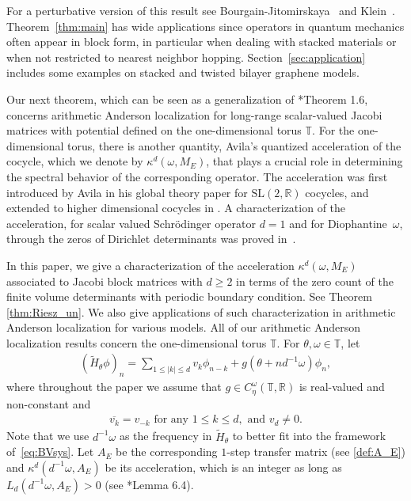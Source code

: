 \documentclass[11pt]{amsart}
\newcommand{\R}{\mathbb R}
\newcommand{\T}{\mathbb T}
\begin{document}
For a perturbative version of this result see Bourgain-Jitomirskaya~\cite{BJ} and Klein~\cite{Kl}.
Theorem~\ref{thm:main} has wide applications since operators in quantum mechanics often appear in block form, in particular when dealing with stacked materials or when not restricted to nearest neighbor hopping.   
Section~\ref{sec:application} includes some examples on stacked and twisted bilayer graphene models.


Our next theorem,  which can be seen as a generalization of \cite{HS2}*{Theorem 1.6}, concerns arithmetic Anderson localization for long-range scalar-valued Jacobi matrices with potential defined on the one-dimensional torus $\T$. 
For the one-dimensional torus, there is another quantity, Avila's quantized acceleration of the cocycle, which we denote by $\kappa^d(\omega,M_E)$, that plays a crucial role in determining the spectral behavior of the corresponding operator.
The acceleration was first introduced by Avila in his global theory paper \cite{Global} for $\mathrm{SL}(2,\R)$ cocycles, and extended to higher dimensional cocycles in \cite{AJS}.
A characterization of the acceleration, for scalar valued Schr\"odinger operator $d=1$ and for Diophantine~$\omega$, through the zeros of Dirichlet determinants was proved in~\cite{HS2}. 

In this paper, we give a characterization of the acceleration $\kappa^d(\omega,M_E)$ associated to Jacobi block matrices with $d\geq 2$ in terms of the zero count of the finite volume determinants with periodic boundary condition. See Theorem \ref{thm:Riesz_un}. 
We also give applications of such characterization in arithmetic Anderson localization for various models.
All of our arithmetic Anderson localization results concern the one-dimensional torus $\T$.
For $\theta,\omega\in \T$, let 
\begin{align}\label{def:tH}
    (\tilde{H}_{\theta}\phi)_n=\sum_{1\leq |k|\leq d} v_k\phi_{n-k}+g(\theta+nd^{-1}\omega) \phi_n,
\end{align}
where throughout the paper we assume that $g\in C_{\eta}^{\omega}(\T,\R)$ is real-valued and non-constant and
\begin{align}\label{eq:basic_assume_v}
\overline{v_k}=v_{-k} \text{ for any } 1\leq k\leq d, \text{ and }
v_d\neq 0.
\end{align}
Note that we use $d^{-1}\omega$ as the frequency in $\tilde{H}_{\theta}$ to better fit into the framework of~\eqref{eq:BVsys}.
Let $A_E$ be the corresponding $1$-step transfer matrix (see \eqref{def:A_E}) and $\kappa^d(d^{-1}\omega,A_E)$ be its acceleration, which is an integer as long as $L_d(d^{-1}\omega,A_E)>0$ (see \cite{AJS}*{Lemma 6.4}).
\end{document}
